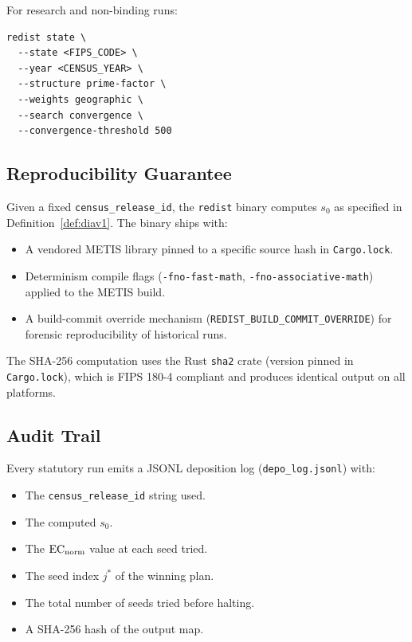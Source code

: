 For research and non-binding runs:

\begin{verbatim}
redist state \
  --state <FIPS_CODE> \
  --year <CENSUS_YEAR> \
  --structure prime-factor \
  --weights geographic \
  --search convergence \
  --convergence-threshold 500
\end{verbatim}

\subsection{Reproducibility Guarantee}

Given a fixed \texttt{census\_release\_id}, the \texttt{redist} binary
computes $s_0$ as specified in Definition~\ref{def:diav1}.
The binary ships with:
\begin{itemize}
\item A vendored METIS library pinned to a specific source hash in
      \texttt{Cargo.lock}.
\item Determinism compile flags (\texttt{-fno-fast-math},
      \texttt{-fno-associative-math}) applied to the METIS build.
\item A build-commit override mechanism (\texttt{REDIST\_BUILD\_COMMIT\_OVERRIDE})
      for forensic reproducibility of historical runs.
\end{itemize}

The SHA-256 computation uses the Rust \texttt{sha2} crate (version pinned in
\texttt{Cargo.lock}), which is FIPS 180-4 compliant and produces identical
output on all platforms.

\subsection{Audit Trail}

Every statutory \cs{} run emits a JSONL deposition log
(\texttt{depo\_log.jsonl}) with:
\begin{itemize}
\item The \texttt{census\_release\_id} string used.
\item The computed $s_0$.
\item The $\mathrm{EC}_{\mathrm{norm}}$ value at each seed tried.
\item The seed index $j^*$ of the winning plan.
\item The total number of seeds tried before halting.
\item A SHA-256 hash of the output map.
\end{itemize}

